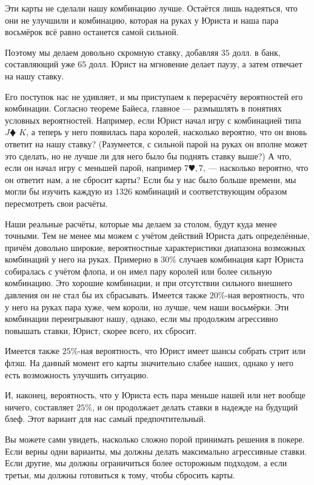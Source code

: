 \documentclass[12pt, a4paper, oneside]{extreport}
\theoremstyle{plain}              %
\theoremstyle{definition}         %
\begin{document}
Эти карты не сделали нашу комбинацию лучше. Остаётся лишь надеяться, что они не улучшили и комбинацию, которая на руках у Юриста и наша пара восьмёрок всё равно останется самой сильной.

Поэтому мы делаем довольно скромную ставку, добавляя $35$ долл. в банк, составляющий уже $65$ долл. Юрист на мгновение делает паузу, а затем отвечает на нашу ставку.

Его поступок нас не удивляет, и мы приступаем к перерасчёту вероятностей его комбинации. Согласно теореме Байеса, главное --- размышлять в понятиях условных вероятностей. Например, если Юрист начал игру с комбинацией типа $J \vardiamond$  $K$\spadesuit, а теперь у него появилась пара королей, насколько вероятно, что он вновь ответит на нашу ставку? (Разумеется, с сильной парой на руках он вполне может это сделать, но не лучше ли для него было бы поднять ставку выше?) А что, если он начал игру с меньшей парой, например $ 7\varheart, 7$\spadesuit, --- насколько вероятно, что он ответит нам, а не сбросит карты? Если бы у нас было больше времени, мы могли бы изучить каждую из $1326$ комбинаций и соответствующим образом пересмотреть свои расчёты.

Наши реальные расчёты, которые мы делаем за столом, будут куда менее точными. Тем не менее мы можем с учётом действий Юриста дать определённые, причём довольно широкие, вероятностные характеристики диапазона возможных комбинаций у него на руках. Примерно в $30\%$ случаев комбинация карт Юриста собиралась с учётом флопа, и он имел пару королей или более сильную комбинацию. Это хорошие комбинации, и при отсутствии сильного внешнего давления он не стал бы их сбрасывать. Имеется также $20\%$-ная вероятность, что у него на руках пара хуже, чем короли, но лучше, чем наши восьмёрки. Эти комбинации переигрывают нашу, однако, если мы продолжим агрессивно повышать ставки, Юрист, скорее всего, их сбросит.

Имеется также $25\%$-ная вероятность, что Юрист имеет шансы собрать стрит или флэш. На данный момент его карты значительно слабее наших, однако у него есть возможность улучшить ситуацию.

И, наконец, вероятность, что у Юриста есть пара меньше нашей или нет вообще ничего, составляет $25\%$, и он продолжает делать ставки в надежде на будущий блеф. Этот вариант для нас самый предпочтительный.

Вы можете сами увидеть, насколько сложно порой принимать решения в покере. Если верны одни варианты, мы должны делать максимально агрессивные ставки. Если другие, мы должны ограничиться более осторожным подходом, а если третьи, мы должны готовиться к тому, чтобы сбросить карты.
\end{document}
